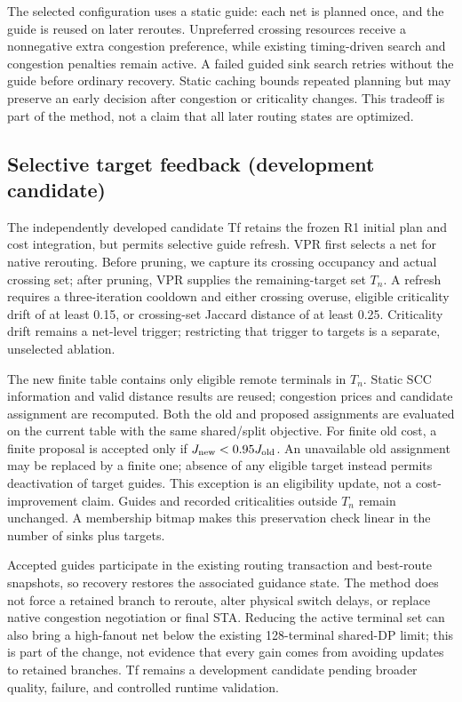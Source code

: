 \documentclass[conference,10pt]{IEEEtran}
\begin{document}
The selected configuration uses a static guide: each net is planned once, and the guide is reused on later reroutes. Unpreferred crossing resources receive a nonnegative extra congestion preference, while existing timing-driven search and congestion penalties remain active. A failed guided sink search retries without the guide before ordinary recovery. Static caching bounds repeated planning but may preserve an early decision after congestion or criticality changes. This tradeoff is part of the method, not a claim that all later routing states are optimized.

\subsection{Selective target feedback (development candidate)}
The independently developed candidate Tf retains the frozen R1 initial plan and cost integration, but permits selective guide refresh. VPR first selects a net for native rerouting. Before pruning, we capture its crossing occupancy and actual crossing set; after pruning, VPR supplies the remaining-target set $T_n$. A refresh requires a three-iteration cooldown and either crossing overuse, eligible criticality drift of at least 0.15, or crossing-set Jaccard distance of at least 0.25. Criticality drift remains a net-level trigger; restricting that trigger to targets is a separate, unselected ablation.

The new finite table contains only eligible remote terminals in $T_n$. Static SCC information and valid distance results are reused; congestion prices and candidate assignment are recomputed. Both the old and proposed assignments are evaluated on the current table with the same shared/split objective. For finite old cost, a finite proposal is accepted only if $J_{\rm new}<0.95J_{\rm old}$. An unavailable old assignment may be replaced by a finite one; absence of any eligible target instead permits deactivation of target guides. This exception is an eligibility update, not a cost-improvement claim. Guides and recorded criticalities outside $T_n$ remain unchanged. A membership bitmap makes this preservation check linear in the number of sinks plus targets.

Accepted guides participate in the existing routing transaction and best-route snapshots, so recovery restores the associated guidance state. The method does not force a retained branch to reroute, alter physical switch delays, or replace native congestion negotiation or final STA. Reducing the active terminal set can also bring a high-fanout net below the existing 128-terminal shared-DP limit; this is part of the change, not evidence that every gain comes from avoiding updates to retained branches. Tf remains a development candidate pending broader quality, failure, and controlled runtime validation.
\end{document}
